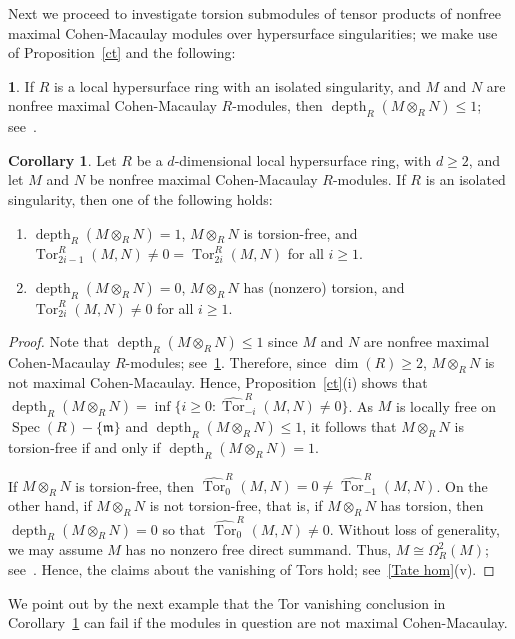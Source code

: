 \documentclass[11pt]{amsart}
\theoremstyle{definition}
\newtheorem{cor}[thm]{Corollary}
\theoremstyle{definition}
\newtheorem{chunk}[thm]{\hspace*{-1.065ex}\bf}
\numberwithin{equation}{section}
\newcommand{\fm}{\mathfrak{m}}
\DeclareMathOperator{\depth}{depth}
\DeclareMathOperator{\Spec}{Spec}
\DeclareMathOperator{\Tor}{Tor}
\begin{document}
Next we proceed to investigate torsion submodules of tensor products of nonfree maximal Cohen-Macaulay modules over hypersurface singularities; we make use of Proposition~\ref{ct} and the following:

\begin{chunk} \label{SRT} If $R$ is a local hypersurface ring with an isolated singularity, and $M$ and $N$ are nonfree maximal Cohen-Macaulay $R$-modules, then $\depth_R(M\otimes_RN)\leq1$; see~\cite[4.7]{CST}. 
\end{chunk}

\begin{cor} \label{corcombined} Let $R$ be a $d$-dimensional local hypersurface ring, with $d\geq 2$, and let $M$ and $N$ be nonfree maximal Cohen-Macaulay $R$-modules. If $R$ is an isolated singularity, then one of the following holds:
\begin{enumerate}[\rm(i)]
\item $\depth_R(M\otimes_RN)=1$, $M\otimes_RN$ is torsion-free, and $\Tor_{2i-1}^R(M,N) \neq 0 = \Tor_{2i}^R(M,N)$ for all $i\geq 1$.
\item $\depth_R(M\otimes_RN)=0$, $M\otimes_RN$ has (nonzero) torsion, and $\Tor_{2i}^R(M,N) \neq 0 $ for all $i\geq 1$.
\end{enumerate}
\end{cor}
\begin{proof} 

Note that $\depth_R(M\otimes_RN)\leq 1$ since $M$ and $N$ are nonfree maximal Cohen-Macaulay $R$-modules; see~\ref{SRT}. Therefore, since $\dim(R)\geq 2$, $M\otimes_R N$ is not maximal Cohen-Macaulay. Hence, Proposition~\ref{ct}(i) shows that $\depth_R(M\otimes_RN)=\inf\{i\geq0 : \widehat{\Tor}_{-i}^R(M,N)\neq0\}$. As $M$ is locally free on $\Spec(R)-\{\fm\}$ and $\depth_R(M\otimes_RN)\leq 1$, it follows that $M\otimes_RN$ is torsion-free if and only if $\depth_R(M\otimes_RN)=1$. 

If $M\otimes_RN$ is torsion-free, then $\widehat{\Tor}_{0}^R(M,N)=0 \neq \widehat{\Tor}_{-1}^R(M,N)$. On the other hand, if $M\otimes_RN$ is not torsion-free, that is, if $M\otimes_RN$ has torsion, then $\depth_R(M\otimes_RN)=0$ so that $\widehat{\Tor}_{0}^R(M,N)\neq 0$. Without loss of generality, we may assume $M$ has no nonzero free direct summand. Thus, $M\cong \Omega^2_R(M)$; see~\cite[6.1(ii)]{Ei}. Hence, the claims about the vanishing of Tors hold; see~\ref{Tate hom}(v). 
\end{proof}

We point out by the next example that the Tor vanishing conclusion in Corollary~\ref{corcombined} can fail if the modules in question are not maximal Cohen-Macaulay.
\end{document}
